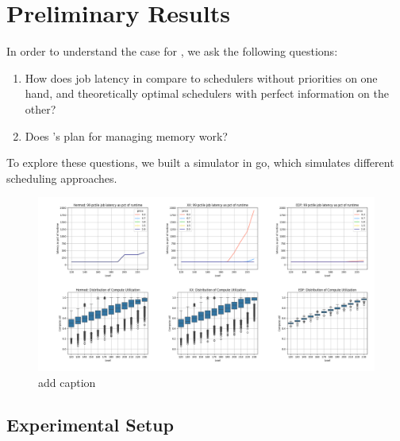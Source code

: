 \section{Preliminary Results}



In order to understand the case for \sys{}, we ask the following questions: 
\begin{enumerate}
    \item How does job latency in \sys{} compare to schedulers without
    priorities on one hand, and theoretically optimal schedulers with perfect
    information on the other?
    \item Does \sys{}'s plan for managing memory work?
\end{enumerate}


To explore these questions, we built a simulator in go\cite{TODO}, which
simulates different scheduling approaches.

\begin{figure}[t!]
    \centering
      \includegraphics[width=16cm]{img/hermod_xx_edf_latencies.png}
      \caption{ add caption }
    \label{fig:hermod-xx-edf}
\end{figure}


\subsection{Experimental Setup}


